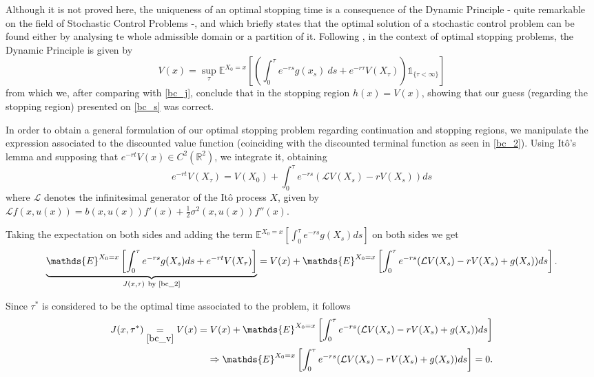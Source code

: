 Although it is not proved here, the uniqueness of an optimal stopping time is a consequence of the Dynamic Principle - quite remarkable on the field of Stochastic Control Problems -, and which briefly states that the optimal solution of a stochastic control problem can be found either by analysing te whole admissible domain or a partition of it. Following \cite{ross}, in the context of optimal stopping problems, the Dynamic Principle is given by
\begin{equation}
V(x)=\sup_\tau \mathds{E}^{X_0=x} \left[ \left( \int^\tau_0 e^{-rs}g(x_s) \ ds + e^{-r \tau}V(X_\tau) \right) \mathds{1}_{ \{\tau< \infty \}}  \right]
\label{bc_2}
\end{equation}
from which we, after comparing with \eqref{bc_j}, conclude that in the stopping region $h(x)=V(x)$, showing that our guess (regarding the stopping region) presented on \eqref{bc_s} was correct. 

In order to obtain a general formulation of our optimal stopping problem regarding continuation and stopping regions, we manipulate the expression associated to the discounted value function (coinciding with the discounted terminal function as seen in \eqref{bc_2}). Using Itô's lemma and supposing that $e^{-r t} V(x) \in C^2(\mathds{R}^2)$, we integrate it, obtaining
\begin{equation*}
e^{-r t} V(X_\tau)=V(X_0)+\int^\tau_0 e^{-rs}(\mathcal{L} V(X_s) -r V(X_s)) ds
\end{equation*}
where $\mathcal{L}$ denotes the infinitesimal generator of the Itô process $X$, given by $\mathcal{L}f(x,u(x))=b(x,u(x)) f'(x)+\frac{1}{2}\sigma^2(x,u(x))f''(x)$.

Taking the expectation on both sides and adding the term $\mathds{E}^{X_0=x}\left[\int^\tau_0 e^{-rs} g(X_s) ds \right]$ on both sides we get
$$\underbrace{ \mathds{E}^{X_0=x} \left[  \int^\tau_0 e^{-rs} g(X_s) ds + e^{-r t} V(X_\tau) \right] }_{J(x,\tau) \ \text{by \eqref{bc_2}}} = V(x) +  \mathds{E}^{X_0=x} \left[ \int^\tau_0 e^{-rs}(\mathcal{L} V(X_s) -r V(X_s)+  g(X_s)) ds \right].$$

Since $\tau^*$ is considered to be the optimal time associated to the problem, it follows
\begin{align}
J(x,\tau^*) 
\underset{\eqref{bc_v}}{=} V(x)=  V(x) +  \mathds{E}^{X_0=x} \left[ \int^\tau_0 e^{-rs}(\mathcal{L} V(X_s) -r V(X_s)+  g(X_s)) ds \right] \nonumber \\
\Rightarrow \mathds{E}^{X_0=x} \left[ \int^\tau_0 e^{-rs}(\mathcal{L} V(X_s) -r V(X_s)+  g(X_s)) ds \right]=0.
\label{bc_3}
\end{align}

